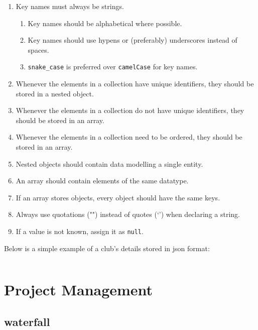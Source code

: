\documentclass[11pt]{article}
\begin{document}
\begin{enumerate}
    \item Key names must always be strings.
    \begin{enumerate}
        \item Key names should be alphabetical where possible.
        \item Key names should use hypens or (preferably) underscores instead of spaces.
        \item \texttt{snake\_case} is preferred over \texttt{camelCase} for key names.
    \end{enumerate}
    \item Whenever the elements in a collection have unique identifiers, they should be stored in a nested \gls{object}.
    \item Whenever the elements in a collection do not have unique identifiers, they should be stored in an \gls{array}.
    \item Whenever the elements in a collection need to be ordered, they should be stored in an \gls{array}.
    \item Nested \glspl{object} should contain data modelling a single entity.
    \item An \gls{array} should contain elements of the same datatype.
    \item If an \gls{array} stores \glspl{object}, every \gls{object} should have the same keys.
    \item Always use quotations ("") instead of quotes (`') when declaring a string.
    \item If a value is not known, assign it as \texttt{null}.
\end{enumerate}

Below is a simple example of a club's details stored in \acrshort{json} format:

\inputminted[linenos=true]{json}{json_examples/club_details.json}

\newpage

\section{Project Management}

\subsection{\Gls{waterfall}}
\end{document}
